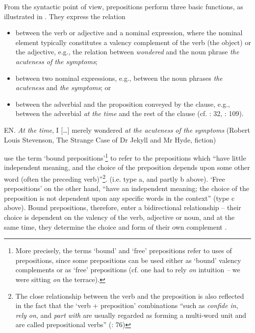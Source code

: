 \documentclass[output=paper]{langscibook}
\begin{document}
From the syntactic point of view, prepositions perform three basic functions, as illustrated in . They express the relation

\begin{itemize}
\item between the verb or adjective and a nominal expression, where the nominal element typically constitutes a valency complement of the verb (the object) or the adjective, e.g., the relation between \textit{wondered} and the noun phrase \textit{the acuteness of the symptoms};
\item between two nominal expressions, e.g., between the noun phrases \textit{the acuteness} and \textit{the symptoms}; or
\item between the adverbial and the proposition conveyed by the clause, e.g., between the adverbial \textit{at the time} and the rest of the clause (cf. \citealt{Čermák1996}: 32, \citealt{BiberEtAl2021}: 109).
\end{itemize}

\ea\label{ex:mala:2}
EN. \textit{At the time}, I […] merely wondered \textit{at the acuteness of the symptoms} (Robert Louis Stevenson, The Strange Case of Dr Jekyll and Mr Hyde, fiction)
\z

\citet[76]{BiberEtAl2021} use the term ‘bound prepositions’\footnote{More precisely, the terms ‘bound’ and ‘free’ prepositions refer to uses of prepositions, since some prepositions can be used either as ‘bound’ valency complements or as ‘free’ prepositions (cf. one had to rely \textit{on} intuition \textit{–} we were sitting \textit{on} the terrace).} to refer to the prepositions which “have little independent meaning, and the choice of the preposition depends upon some other word (often the preceding verb)”\footnote{The close relationship between the verb and the preposition is also reflected in the fact that the ‘verb + preposition’ combinations “such as \textit{confide in}, \textit{rely on}, and \textit{part with} are usually regarded as forming a multi-word unit and are called prepositional verbs” (\citealt{BiberEtAl2021}: 76)}.  (i.e. type a, and partly b above). ‘Free prepositions’ on the other hand, “have an independent meaning; the choice of the preposition is not dependent upon any specific words in the context” (type c above). Bound prepositions, therefore, enter a bidirectional relationship – their choice is dependent on the valency of the verb, adjective or noun, and at the same time, they determine the choice and form of their own complement \citep[33]{Čermák1996}.
\end{document}
